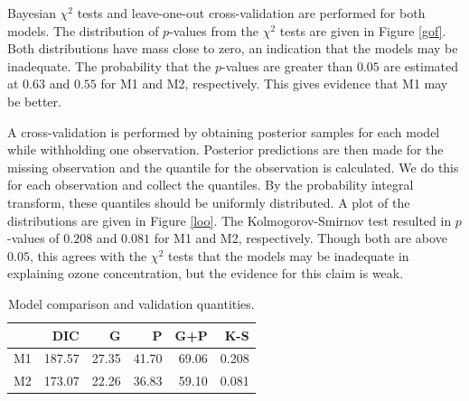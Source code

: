 \documentclass{asaproc}
\begin{document}
Bayesian $\chi^2$ tests and leave-one-out cross-validation are performed for both models. The distribution of $p$-values from the $\chi^2$ tests are given in Figure \ref{gof}. Both distributions have mass close to zero, an indication that the models may be inadequate. The probability that the $p$-values are greater than $0.05$ are estimated at $0.63$ and $0.55$ for M1 and M2, respectively. This gives evidence that M1 may be better.

A cross-validation is performed by obtaining posterior samples for each model while withholding one observation. Posterior predictions are then made for the missing observation and the quantile for the observation is calculated. We do this for each observation and collect the quantiles. By the probability integral transform, these quantiles should be uniformly distributed. A plot of the distributions are given in Figure \ref{loo}. The Kolmogorov-Smirnov test resulted in $p$-values of $0.208$ and $0.081$ for M1 and M2, respectively. Though both are above $0.05$, this agrees with the $\chi^2$ tests that the models may be inadequate in explaining ozone concentration, but the evidence for this claim is weak.

\begin{table}
\caption{Model comparison and validation quantities.}
\centering
\begin{tabular}{lrrrrr}
\\ [-5pt]
\hline\hline
   & DIC    & G     & P     & G+P   & K-S   \\ \hline
M1 & 187.57 & 27.35 & 41.70 & 69.06 & 0.208 \\
M2 & 173.07 & 22.26 & 36.83 & 59.10 & 0.081 \\ \hline\hline
\end{tabular}
\label{dic}
\end{table}
\end{document}
